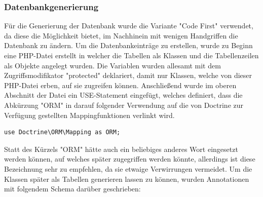    \subsubsection{Datenbankgenerierung}

Für die Generierung der Datenbank wurde die Variante "Code First" verwendet, da diese die Möglichkeit bietet, im Nachhinein mit wenigen Handgriffen die Datenbank zu ändern.
Um die Datenbankeinträge zu erstellen, wurde zu Beginn eine PHP-Datei erstellt in welcher die Tabellen als Klassen und die Tabellenzeilen als Objekte angelegt wurden. Die Variablen wurden allesamt mit dem Zugriffsmodifikator "protected" deklariert, damit nur Klassen, welche von dieser PHP-Datei erben, auf sie zugreifen können. Anschließend wurde im oberen Abschnitt der Datei ein USE-Statement eingefügt, welches definiert, dass die Abkürzung "ORM" in darauf folgender Verwendung auf die von Doctrine zur Verfügung gestellten Mappingfunktionen verlinkt wird.
	
	\lstset{language=php}
  	\begin{lstlisting}
use Doctrine\ORM\Mapping as ORM;
  	\end{lstlisting}
Statt des Kürzels "ORM" hätte auch ein beliebiges anderes Wort eingesetzt werden können, auf welches später zugegriffen werden könnte, allerdings ist diese Bezeichnung sehr zu empfehlen, da sie etwaige Verwirrungen vermeidet.
Um die Klassen später als Tabellen generieren lassen zu können, wurden Annotationen mit folgendem Schema darüber geschrieben:
	
